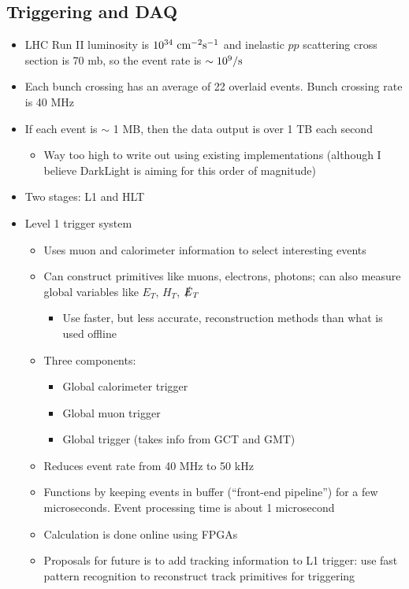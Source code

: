 \subsection{Triggering and DAQ}
\begin{itemize}
  \item LHC Run II luminosity is $10^{34}~\text{cm}^{-2}\text{s}^{-1}$ and inelastic $pp$ scattering cross section is 70 mb, so the event rate is $\sim 10^9/\text{s}$
  \item Each bunch crossing has an average of 22 overlaid events. Bunch crossing rate is 40 MHz
  \item If each event is $\sim$ 1 MB, then the data output is over 1 TB each second
  \begin{itemize}
    \item Way too high to write out using existing implementations (although I believe DarkLight is aiming for this order of magnitude)
  \end{itemize}
  \item Two stages: L1 and HLT
  \item Level 1 trigger system
  \begin{itemize}
    \item Uses muon and calorimeter information to select interesting events
    \item Can construct primitives like muons, electrons, photons; can also measure global variables like $E_T$, $H_T$, $\slashed E_T$
    \begin{itemize}
      \item Use faster, but less accurate, reconstruction methods than what is used offline
    \end{itemize}
    \item Three components:
    \begin{itemize}
      \item Global calorimeter trigger
      \item Global muon trigger
      \item Global trigger (takes info from GCT and GMT)
    \end{itemize}
    \item Reduces event rate from 40 MHz to 50 kHz
    \item Functions by keeping events in buffer (``front-end pipeline'') for a few microseconds. Event processing time is about 1 microsecond
    \item Calculation is done online using FPGAs
    \item Proposals for future is to add tracking information to L1 trigger: use fast pattern recognition to reconstruct track primitives for triggering

\end{itemize}
\end{itemize}
